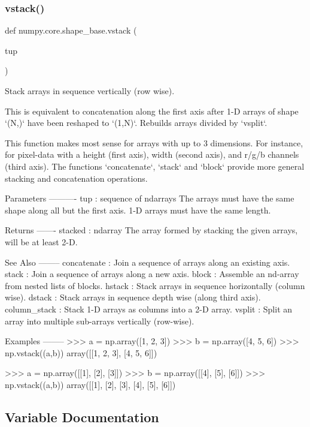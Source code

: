 \subsubsection{\texorpdfstring{vstack()}{vstack()}}
{\footnotesize\ttfamily def numpy.\+core.\+shape\+\_\+base.\+vstack (\begin{DoxyParamCaption}\item[{}]{tup }\end{DoxyParamCaption})}

\begin{DoxyVerb}Stack arrays in sequence vertically (row wise).

This is equivalent to concatenation along the first axis after 1-D arrays
of shape `(N,)` have been reshaped to `(1,N)`. Rebuilds arrays divided by
`vsplit`.

This function makes most sense for arrays with up to 3 dimensions. For
instance, for pixel-data with a height (first axis), width (second axis),
and r/g/b channels (third axis). The functions `concatenate`, `stack` and
`block` provide more general stacking and concatenation operations.

Parameters
----------
tup : sequence of ndarrays
    The arrays must have the same shape along all but the first axis.
    1-D arrays must have the same length.

Returns
-------
stacked : ndarray
    The array formed by stacking the given arrays, will be at least 2-D.

See Also
--------
concatenate : Join a sequence of arrays along an existing axis.
stack : Join a sequence of arrays along a new axis.
block : Assemble an nd-array from nested lists of blocks.
hstack : Stack arrays in sequence horizontally (column wise).
dstack : Stack arrays in sequence depth wise (along third axis).
column_stack : Stack 1-D arrays as columns into a 2-D array.
vsplit : Split an array into multiple sub-arrays vertically (row-wise).

Examples
--------
>>> a = np.array([1, 2, 3])
>>> b = np.array([4, 5, 6])
>>> np.vstack((a,b))
array([[1, 2, 3],
       [4, 5, 6]])

>>> a = np.array([[1], [2], [3]])
>>> b = np.array([[4], [5], [6]])
>>> np.vstack((a,b))
array([[1],
       [2],
       [3],
       [4],
       [5],
       [6]])\end{DoxyVerb}
 

\subsection{Variable Documentation}
\mbox{\label{namespacenumpy_1_1core_1_1shape__base_a45fc2ea67d94098cb4d63aca7a7ef92c}} 

